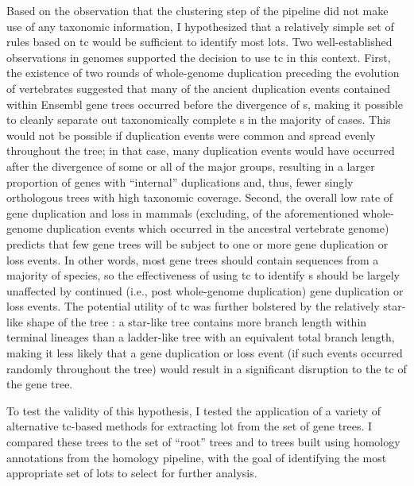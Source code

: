 Based on the observation that the clustering step of the \cmp pipeline
did not make use of any taxonomic information, I hypothesized that a
relatively simple set of rules based on \ac{tc} would be sufficient to
identify most \mammln \acp{lot}. Two well-established observations in
\mammln genomes supported the decision to use \ac{tc} in this
context. First, the existence of two rounds of whole-genome
duplication preceding the evolution of vertebrates \citep{Dehal2005}
suggested that many of the ancient duplication events contained within
Ensembl gene trees occurred before the divergence of \mamml{}s, making
it possible to cleanly separate out taxonomically complete \mammln
\subtr{}s in the majority of cases. This would not be possible if
duplication events were common and spread evenly throughout the
\mammln tree; in that case, many duplication events would have
occurred after the divergence of some or all of the major \mammln
groups, resulting in a larger proportion of \mammln genes with
``internal'' duplications and, thus, fewer singly orthologous trees
with high taxonomic coverage. Second, the overall low rate of gene
duplication and loss in mammals \citep{Demuth2006} (excluding, of the
aforementioned whole-genome duplication events which occurred in the
ancestral vertebrate genome) predicts that few \mammln gene trees will
be subject to one or more gene duplication or loss events. In other
words, most \mammln gene trees should contain sequences from a
majority of \mammln species, so the effectiveness of using \ac{tc} to
identify \mammln \subtr{}s should be largely unaffected by continued
(i.e., post whole-genome duplication) gene duplication or loss
events. The potential utility of \ac{tc} was further bolstered by the
relatively star-like shape of the \mammln tree
\citep{BinindaEmonds2007}: a star-like tree contains more branch
length within terminal lineages than a ladder-like tree with an
equivalent total branch length, making it less likely that a gene
duplication or loss event (if such events occurred randomly throughout
the \mammln tree) would result in a significant disruption to the
\ac{tc} of the gene tree.

To test the validity of this hypothesis, I tested the application of a
variety of alternative \ac{tc}-based methods for extracting \ac{lot}
from the set of \cmp gene trees. I compared these trees to the set of
``root'' \cmp trees and to trees built using homology annotations from
the \ens homology pipeline, with the goal of identifying the most
appropriate set of \acp{lot} to select for further analysis.

